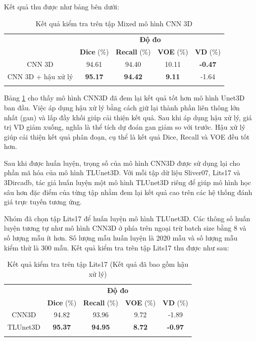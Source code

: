 Kết quả thu được như bảng bên dưới:
\begin{table}[H]
\renewcommand{\arraystretch}{1.2}
\centering
\begin{tabular}{c|c|c|c|c}
\Xhline{3\arrayrulewidth}
\multirow{2}{*}{\textbf{Thí nghiệm}} & \multicolumn{4}{c}{\textbf{Độ đo}}                             \\ \cline{2-5} 
                & \textbf{Dice} (\%) & \textbf{Recall} (\%) & \textbf{VOE} (\%) & \textbf{VD} (\%) \\ 
                \hline
CNN 3D          & 94.61              & 94.40                & 10.11    & \textbf{-0.47} \\ \hline
CNN 3D + hậu xử lý  & \textbf{95.17}   & \textbf{94.42} & \textbf{9.11}   & -1.64       \\ 
\Xhline{3\arrayrulewidth}
\end{tabular}
\caption{Kết quả kiểm tra trên tập Mixed mô hình CNN 3D}
\label{tab:CNN3D-result}
\end{table}
\vspace{-5mm}
Bảng \ref{tab:CNN3D-result} cho thấy mô hình CNN3D đã đem lại kết quả tốt hơn mô hình Unet3D ban đầu. Việc áp dụng hậu xử lý bằng cách giữ lại thành phần liên thông lớn nhất (gan) và lấp đầy khối giúp cải thiện kết quả. Sau khi áp dụng hậu xử lý, giá trị VD giảm xuống, nghĩa là thể tích dự đoán gan giảm so với trước. Hậu xử lý giúp cải thiện kết quả phân đoạn, cụ thể là kết quả Dice, Recall và VOE đều tốt hơn.\par
Sau khi được huấn luyện, trọng số của mô hình CNN3D được sử dụng lại cho phần mã hóa của mô hình TLUnet3D. Với mỗi tập dữ liệu Sliver07, Lits17 và 3Dircadb, tác giả huấn luyện một mô hình TLUnet3D riêng để giúp mô hình học sâu hơn đặc điểm của từng tập nhằm đem lại kết quả cao trên các hệ thống đánh giá trực tuyến tương ứng. \par
Nhóm đã chọn tập Lits17 để huấn luyện mô hình TLUnet3D. Các thông số huấn luyện tương tự như mô hình CNN3D ở phía trên ngoại trừ batch size bằng 8 và số lượng mẫu ít hơn. Số lượng mẫu huấn luyện là 2020 mẫu và số lượng mẫu kiểm thử là 300 mẫu. Kết quả kiểm tra trên tập Lits17 thu được như sau:
\begin{table}[H]
\renewcommand{\arraystretch}{1.1}
\centering
\begin{tabular}{c|c|c|c|c}
\Xhline{3\arrayrulewidth}
\multirow{2}{*}{\textbf{Thí nghiệm}} & \multicolumn{4}{c}{\textbf{Độ đo}}                             \\ \cline{2-5} 
                                     & \textbf{Dice} (\%) & \textbf{Recall} (\%) & \textbf{VOE} (\%) & \textbf{VD} (\%) \\ \hline
CNN3D                            & 94.82     & 93.96     & 9.72     & -1.89    \\ \hline
TLUnet3D             & \textbf{95.37}       & \textbf{94.95}     & \textbf{8.72}   & \textbf{-0.97}      \\ 
\Xhline{3\arrayrulewidth}
\end{tabular}
\caption{Kết quả kiểm tra trên tập Lits17 (Kết quả đã bao gồm hậu xử lý)}
\end{table}
\vspace{-5mm}

